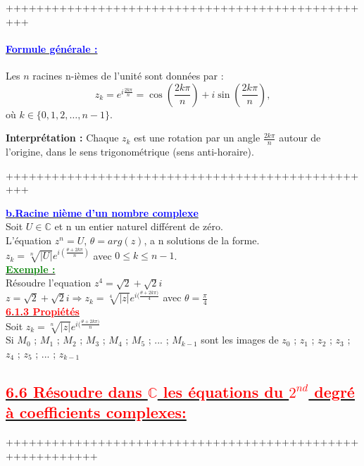 \documentclass[12pt]{article}
\newcounter{exemple} %
\newcommand{\exemple}{%
  \refstepcounter{exemple}%
  \textbf{\textcolor{green}{Exemple \theexemple :}} \ignorespaces
}
\begin{document}
+++++++++++++++++++++++++++++++++++++++++++++++++

\paragraph{\underline{\textbf{\textcolor{blue}{Formule générale :}}}}
Les \(n\) racines n-ièmes de l’unité sont données par :
\[
z_k = e^{i\frac{2k\pi}{n}} = \cos\left(\frac{2k\pi}{n}\right) + i\sin\left(\frac{2k\pi}{n}\right),
\]
où \(k \in \{0, 1, 2, \ldots, n-1\}\).

\textbf{Interprétation :} Chaque \(z_k\) est une rotation par un angle \(\frac{2k\pi}{n}\) autour de l’origine, dans le sens trigonométrique (sens anti-horaire). 

+++++++++++++++++++++++++++++++++++++++++++++++++

\underline{\textbf{\textcolor{blue}{b.Racine nième d'un nombre complexe}}}\\
Soit $U \in \mathbb{C}$ et n un entier naturel différent de zéro.\\
L'équation $z^{n}=U$, $\theta=arg(z)$, a n solutions de la forme.\\
$z_{k}=\sqrt[n]{|U|}e^{i(\frac{\theta+2k\pi}{n})}$ avec $ 0\leq k \leq n-1 $.\\
\underline{\exemple}\\
Résoudre l'equation $z^{4}=\sqrt{2}+\sqrt{2}i$\\
$z=\sqrt{2}+\sqrt{2}i \Longrightarrow z_{k}=\sqrt[4]{|z|}e^{i(\frac{\theta+2k\pi)}{4}}$ avec 
$\theta=\frac{\pi}{4}$\\
\underline{\textbf{\textcolor{red}{6.1.3 Propiétés}}}\\
Soit $z_{k}=\sqrt[n]{|z|}e^{i(\frac{\theta+2k\pi)}{n}}$\\
Si $M_{0}$ ; $M_{1}$ ; $M_{2}$ ; $M_{3}$ ; $M_{4}$ ; $M_{5}$ ; ... ; $M_{k-1}$ sont les images de $z_{0}$ ; $z_{1}$ ; $z_{2}$ ; $z_{3}$ ; $z_{4}$ ; $z_{5}$ ; ... ; $z_{k-1}$
\subsection*{\underline{\textbf{\textcolor{red}{6.6 Résoudre dans $\mathbb{C}$ les équations du $2^{nd}$ degré à coefficients complexes:}}}}
++++++++++++++++++++++++++++++++++++++++++++++++++++++++++
\end{document}
